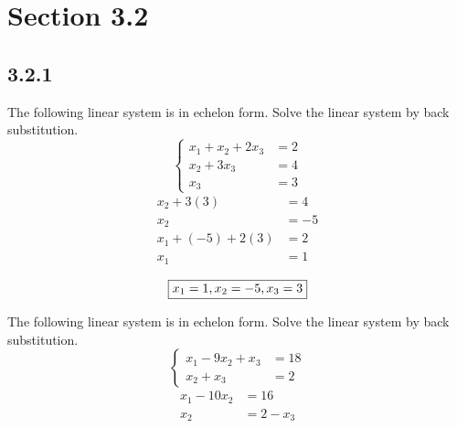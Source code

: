 \documentclass{article}
\begin{document}
\newcommand{\hr}{\par\noindent\rule{\textwidth}{0.4pt}}

\newcommand{\bc}[1]{
	\begin{equation*}
		\begin{boxed}
			{#1}
		\end{boxed}
	\end{equation*}
}

\newcommand{\cond}[2]{
	\ifmmode
		{#1} \quad {#2}
	\else
		$$ {#1} \quad {#2} $$
	\fi
}

\tableofcontents

\section{Section 3.2}

\subsection{3.2.1}
The following linear system is in echelon form. Solve the linear system by back substitution.
\begin{equation*}
	\left\{
		\begin{aligned}
			x_1 + x_2 + 2x_3 & = 2 \\
			x_2 + 3x_3 & = 4 \\
			x_3 & = 3
		\end{aligned}
	\right.
\end{equation*}
\begin{align*}
	x_2 + 3(3) & = 4 \\
	x_2 & = -5 \\
	x_1 + (-5) + 2(3) & = 2 \\
	x_1 & = 1
\end{align*}
\bc{x_1 = 1, x_2 = -5, x_3 = 3}

The following linear system is in echelon form. Solve the linear system by back substitution.
\begin{equation*}
	\left\{
		\begin{aligned}
			x_1 - 9x_2 + x_3 & = 18 \\
			x_2 + x_3 & = 2
		\end{aligned}
	\right.
\end{equation*}
\begin{align*}
	x_1 - 10x_2 & = 16 \\
	x_2 & = 2 - x_3
\end{align*}
\end{document}
